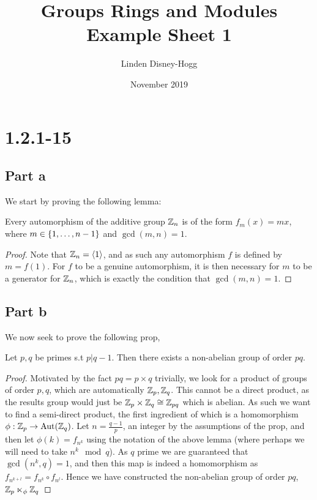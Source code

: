 \documentclass{article}
\title{Groups Rings and Modules Example Sheet 1}
\author{Linden Disney-Hogg}
\date{November 2019}
\begin{document}
\maketitle
\tableofcontents

\section{1.2.1-15}
\subsection{Part a}
We start by proving the following lemma:

\begin{lemma}
Every automorphism of the additive group $\mathbb{Z}_n$ is of the form $f_m(x) = mx$, where $m \in \left\{ 1,\dots,n-1 \right\}$ and $\gcd(m,n)=1$. 
\end{lemma}
\begin{proof}
Note that $\mathbb{Z}_n = \left\langle 1 \right\rangle$, and as such any automorphism $f$ is defined by $m = f(1)$. For $f$ to be a genuine automorphism, it is then necessary for $m$ to be a generator for $\mathbb{Z}_n$, which is exactly the condition that $\gcd(m,n)=1$. 
\end{proof}

\subsection{Part b}

We now seek to prove the following prop,

\begin{prop}
Let $p,q$ be primes s.t $p \rvert q-1$. Then there exists a non-abelian group of order $pq$. 
\end{prop}
\begin{proof}
Motivated by the fact $pq = p \times q$ trivially, we look for a product of groups of order $p,q$, which are automatically $\mathbb{Z}_p, \mathbb{Z}_q$. This cannot be a direct product, as the results group would just be $\mathbb{Z}_p \times \mathbb{Z}_q \cong \mathbb{Z}_{pq}$ which is abelian. As such we want to find a semi-direct product, the first ingredient of which is a homomorphism $\phi : \mathbb{Z}_p \to \operatorname{Aut}(\mathbb{Z}_q)$. Let $n = \frac{q-1}{p}$, an integer by the assumptions of the prop, and then let $\phi(k) = f_{n^k}$ using the notation of the above lemma (where perhaps we will need to take $n^k \mod q$). As $q$ prime we are guaranteed that $\gcd(n^k,q)=1$, and then this map is indeed a homomorphism as $f_{n^{k+l}} = f_{n^k} \circ f_{n^l}$. Hence we have constructed the non-abelian group of order $pq$, $\mathbb{Z}_p \ltimes_\phi \mathbb{Z}_q$
\end{proof}
\end{document}
